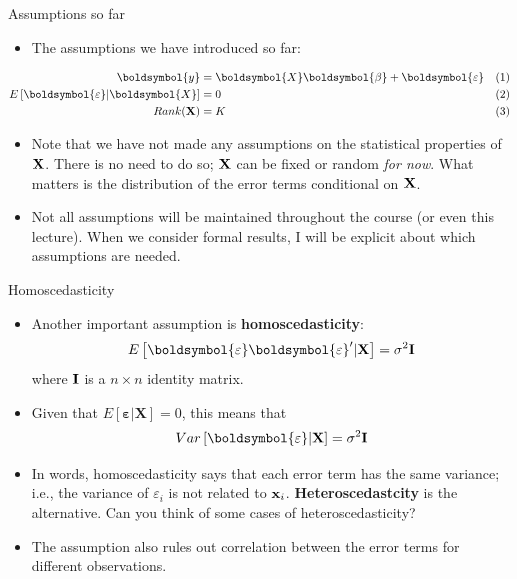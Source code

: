 \documentclass[aspectratio=169,11pt]{beamer}
\begin{document}
\begin{frame}{Assumptions so far}
\begin{itemize}
	\item The assumptions we have introduced so far:
\end{itemize}

\begin{align*}
\boldsymbol{y} & =  \boldsymbol{X}\boldsymbol{\beta}+\boldsymbol{\varepsilon}	& (1)\\
E\left[\boldsymbol{\varepsilon}|\boldsymbol{X}\right] & =  0						& (2) \\
Rank({\bf X}) & = K 	& (3)
\end{align*}

\begin{itemize}
	\item Note that we have not made any assumptions on the statistical properties of ${\bf X}$.
	There is no need to do so; ${\bf X}$ can be fixed or random \emph{for now}. What matters
	is the distribution of the error terms conditional on  ${\bf X}$.

	\item Not all assumptions will be maintained throughout the course (or even this lecture).
	When we consider formal results, I will be explicit about which assumptions are needed. 
	
\end{itemize}
\end{frame}

\begin{frame}{Homoscedasticity}
\begin{itemize}
	\item Another important assumption is {\bf homoscedasticity}:\[
		E\left[\boldsymbol{\varepsilon} \boldsymbol{\varepsilon}' | {\bf X} \right] = \sigma^{2} {\bf I}
	\]
	where ${\bf I}$ is a  $n \times n$ identity matrix.

	\medskip
	\item Given that $E\left[\boldsymbol{\varepsilon}|\boldsymbol{X}\right] =  0$, this means that\[
	Var\left[\boldsymbol{\varepsilon} | {\bf X} \right] = \sigma^{2} {\bf I}
	\]

	\item In words, homoscedasticity says that each error term has the same variance; i.e.,   
	the variance of $\varepsilon_i$ is not related to ${\bf x}_i$. {\bf Heteroscedastcity}
	is the alternative. Can you think of some cases of heteroscedasticity? 

	\item The assumption also rules out correlation between the error terms for different observations.
	
\end{itemize}
\end{frame}
\end{document}
